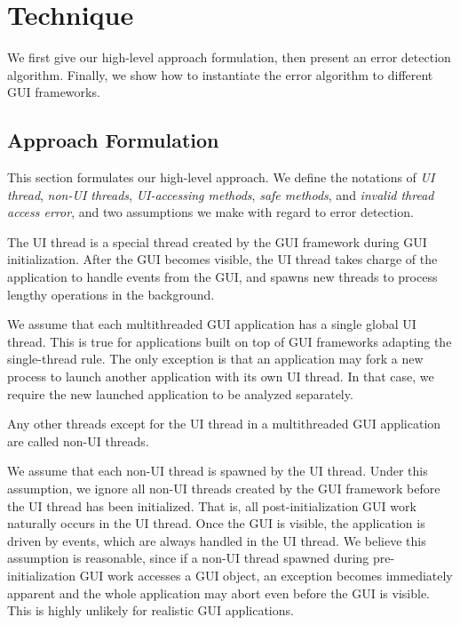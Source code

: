 \section{Technique}
\label{sec:technique}

We first give our high-level approach formulation, then present
an error detection algorithm. Finally, we show how to instantiate
the error algorithm to different GUI frameworks.


\subsection{Approach Formulation}

This section formulates our high-level approach. We define the
notations of \textit{UI thread}, \textit{non-UI threads},
\textit{UI-accessing methods},
 \textit{safe methods}, and \textit{invalid thread access error}, and
two assumptions we make with regard to error detection.

 {The UI thread
is a special thread created by the GUI framework during
GUI initialization. After the GUI becomes visible, the UI thread
takes charge of the application to handle events from the GUI,
and spawns new threads to process lengthy operations in the background. }\vspace{1mm}

 {We assume that each multithreaded
GUI application has a single global UI thread. This is true for applications
built on top of GUI frameworks adapting the single-thread rule. The
only exception is that 
 an application may fork a new process to launch another
application with its own UI thread. In that case, we require the new
launched application to be analyzed separately.}\vspace{1mm}

 {Any other
threads except for the UI thread in a multithreaded GUI application
 are called non-UI threads.}\vspace{1mm}

 { We assume that each non-UI
thread is spawned by the UI thread. Under this assumption,
we ignore all non-UI threads created by the GUI framework
before the UI thread has been initialized. That is, all post-initialization
GUI work naturally occurs in the UI thread. Once the GUI is visible, the
application is driven by events, which are always handled in the UI thread.
We believe this assumption is reasonable, since if a non-UI thread 
spawned during pre-initialization GUI work accesses a GUI object, an exception becomes
immediately apparent and the whole application may abort even before the
GUI is visible. This is highly unlikely for realistic GUI
applications.
}\vspace{1mm}

